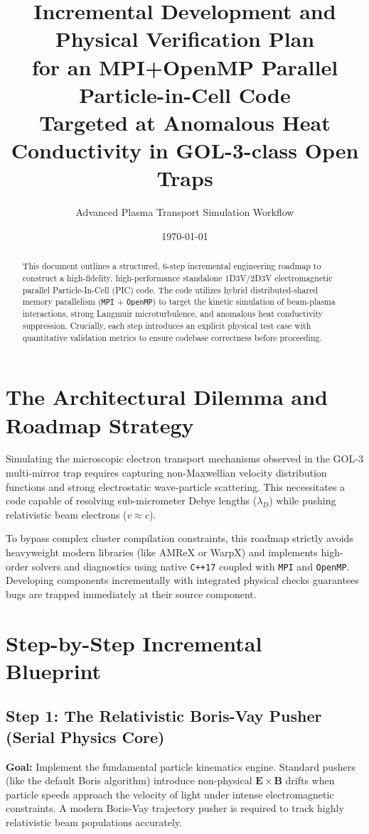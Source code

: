 \documentclass[11pt,a4paper]{article}
\title{Incremental Development and Physical Verification Plan \\ for an MPI+OpenMP Parallel Particle-in-Cell Code \\ \large Targeted at Anomalous Heat Conductivity in GOL-3-class Open Traps}
\author{Advanced Plasma Transport Simulation Workflow}
\date{\today}
\begin{document}
\maketitle

\begin{abstract}
This document outlines a structured, 6-step incremental engineering roadmap to construct a high-fidelity, high-performance standalone 1D3V/2D3V electromagnetic parallel Particle-In-Cell (PIC) code. The code utilizes hybrid distributed-shared memory parallelism (\texttt{MPI} + \texttt{OpenMP}) to target the kinetic simulation of beam-plasma interactions, strong Langmuir microturbulence, and anomalous heat conductivity suppression. Crucially, each step introduces an explicit physical test case with quantitative validation metrics to ensure codebase correctness before proceeding.
\end{abstract}

\section{The Architectural Dilemma and Roadmap Strategy}
Simulating the microscopic electron transport mechanisms observed in the GOL-3 multi-mirror trap requires capturing non-Maxwellian velocity distribution functions and strong electrostatic wave-particle scattering. This necessitates a code capable of resolving sub-micrometer Debye lengths (\(\lambda_D\)) while pushing relativistic beam electrons (\(v \approx c\)). 

To bypass complex cluster compilation constraints, this roadmap strictly avoids heavyweight modern libraries (like AMReX or WarpX) and implements high-order solvers and diagnostics using native \texttt{C++17} coupled with \texttt{MPI} and \texttt{OpenMP}. Developing components incrementally with integrated physical checks guarantees bugs are trapped immediately at their source component.

\section{Step-by-Step Incremental Blueprint}

\subsection{Step 1: The Relativistic Boris-Vay Pusher (Serial Physics Core)}
\textbf{Goal:} Implement the fundamental particle kinematics engine. Standard pushers (like the default Boris algorithm) introduce non-physical \(\mathbf{E}\times\mathbf{B}\) drifts when particle speeds approach the velocity of light under intense electromagnetic constraints. A modern Boris-Vay trajectory pusher is required to track highly relativistic beam populations accurately.
\end{document}
